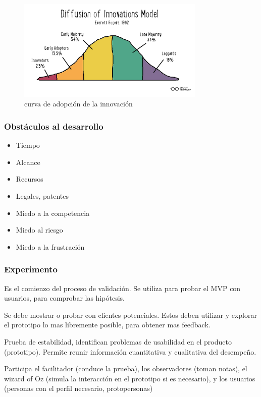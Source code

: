 \documentclass[titlepage,a4paper]{article}
\begin{document}
\begin{figure}[!htb]
    \centering
    \includegraphics[width=0.8\textwidth]{Imagenes/CurvaInnovacion.png}
    \caption{curva de adopción de la innovación}
\end{figure}

\subsubsection*{Obstáculos al desarrollo}

\begin{itemize}
    \item Tiempo
    \item Alcance
    \item Recursos
    \item Legales, patentes
    \item Miedo a la competencia
    \item Miedo al riesgo
    \item Miedo a la frustración
\end{itemize}

\subsubsection*{Experimento}
Es el comienzo del proceso de validación. Se utiliza para probar el MVP con usuarios, para comprobar las hipótesis.

Se debe mostrar o probar con clientes potenciales. Estos deben utilizar y explorar el prototipo lo mas libremente posible, para obtener mas feedback.

Prueba de estabilidad, identifican problemas de usabilidad en el producto (prototipo). Permite reunir información cuantitativa y cualitativa del desempeño.

Participa el facilitador (conduce la prueba), los observadores (toman notas), el wizard of Oz (simula la interacción en el prototipo si es necesario), y los usuarios (personas con el perfil necesario, protopersonas)
\end{document}
